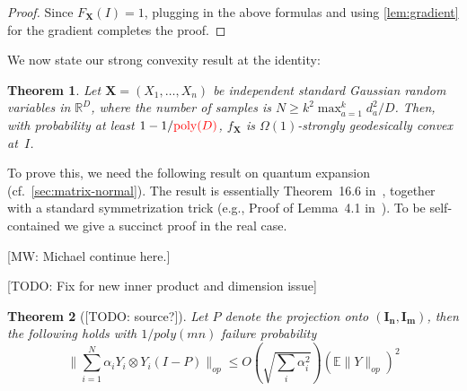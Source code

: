 \documentclass{article}
\newtheorem{theorem}{Theorem}
\DeclareMathOperator{\poly}{poly}
\newcommand{\R}{{\mathbb{R}}}
\newcommand{\ot}{\otimes}
\renewcommand{\vec}{\bm}
\newcommand{\E}{\mathbb{E}}
\newcommand\tr{\operatorname{Tr}}
\newcommand{\MW}[1]{{\color{red}[MW: #1]}}
\newcommand{\TODO}[1]{{\color{blue}[TODO: #1]}}
\begin{document}
\begin{proof}
  Since $F_{\vec X}(I)=1$, plugging in the above formulas and using \cref{lem:gradient} for the gradient completes the proof.
\end{proof}

We now state our strong convexity result at the identity:

\begin{theorem}\label{thm:tensor-convexity}
Let $\vec X = (X_1,\dots,X_n)$ be independent standard Gaussian random variables in $\R^D$, where the number of samples is $N \geq k^2 \max_{a=1}^k d_a^2 / D$.
Then, with probability at least $1 - 1/{\color{red}\poly(D)}$, $f_{\vec X}$ is {\color{red}$\Omega(1)$}-strongly geodesically convex at~$I$.
\end{theorem}

To prove this, we need the following result on quantum expansion (cf.\ \cref{sec:matrix-normal}).
The result is essentially Theorem~16.6 in~\cite{pisier2012grothendieck}, together with a standard symmetrization trick (e.g., Proof of Lemma~4.1 in~\cite{P14}).
To be self-contained we give a succinct proof in the real case.

\MW{Michael continue here.}

\TODO{Fix for new inner product and dimension issue}

\begin{theorem}[\TODO{source?}]
Let $P$ denote the projection onto $(\vec{I_{n}},\vec{I_{m}})$, then the following holds with $1/poly(mn)$ failure probability
\[ \|\sum_{i=1}^{N} \alpha_{i} Y_{i} \otimes Y_{i} (I - P) \|_{op} \leq O \left( \sqrt{\sum_{i} \alpha_{i}^{2}} \right) \left( \E \|Y\|_{op} \right)^{2} \]
\end{theorem}
\end{document}
